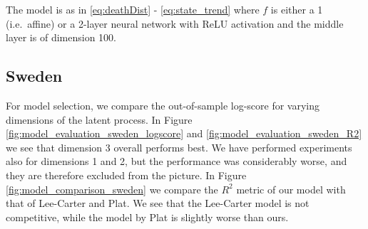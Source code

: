 \documentclass[preprint,12pt]{elsarticle}
\begin{document}
The model is as in \eqref{eq:deathDist} - \eqref{eq:state_trend} where $f$ is either a 1 (i.e.\ affine) or a 2-layer neural network with ReLU activation and the middle layer is of dimension 100.
\subsection{Sweden}\label{seq:results_sweden}
For model selection, we compare the out-of-sample log-score for varying dimensions of the latent process. In Figure \ref{fig:model_evaluation_sweden_logscore} and \ref{fig:model_evaluation_sweden_R2} we see that dimension 3 overall performs best. We have performed experiments also for dimensions 1 and 2, but the performance was considerably worse, and they are therefore excluded from the picture. In Figure \ref{fig:model_comparison_sweden} we compare the $R^2$ metric of our model with that of Lee-Carter and Plat. We see that the Lee-Carter model is not competitive, while the model by Plat is slightly worse than ours.
\end{document}
